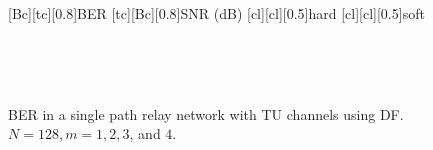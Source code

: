 \begin{figure}
    [Bc][tc][0.8]{BER}
    [tc][Bc][0.8]{SNR (dB)}
    [cl][cl][0.5]{hard}
    [cl][cl][0.5]{soft}

\centerline{
	 \\
}
\centerline{
	 \\
}
\caption{BER in a single path relay network with TU channels using DF.  $N = 128, m = 1, 2, 3$, and $4$.}
\label{fig:sp_df_ber_plots_TU}
\end{figure}

